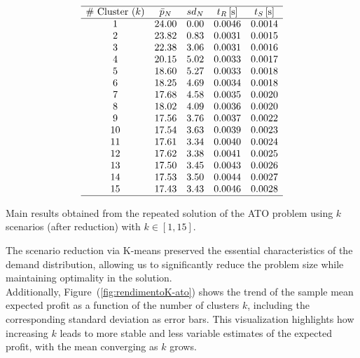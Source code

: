 \documentclass[a4paper,12pt]{article}
\begin{document}
	\begin{table}
		
	\[
	\begin{array}{ccccc}
		\hline
		\text{\# Cluster $(k)$} & \text{$\bar{p}_{N}$} & \text{$sd_{N}$} & \text{$t_{R}$\,[s]} & \text{$t_{S}$\,[s]} \\
		\hline
		1  & 24.00 & 0.00 & 0.0046 & 0.0014 \\
		2  & 23.82 & 0.83 & 0.0031 & 0.0015 \\
		3  & 22.38 & 3.06 & 0.0031 & 0.0016 \\
		4  & 20.15 & 5.02 & 0.0033 & 0.0017 \\
		5  & 18.60 & 5.27 & 0.0033 & 0.0018 \\
		6  & 18.25 & 4.69 & 0.0034 & 0.0018 \\
		7  & 17.68 & 4.58 & 0.0035 & 0.0020 \\
		8  & 18.02 & 4.09 & 0.0036 & 0.0020 \\
		9  & 17.56 & 3.76 & 0.0037 & 0.0022 \\
		10 & 17.54 & 3.63 & 0.0039 & 0.0023 \\
		11 & 17.61 & 3.34 & 0.0040 & 0.0024 \\
		12 & 17.62 & 3.38 & 0.0041 & 0.0025 \\
		13 & 17.50 & 3.45 & 0.0043 & 0.0026 \\
		14 & 17.53 & 3.50 & 0.0044 & 0.0027 \\
		15 & 17.43 & 3.43 & 0.0046 & 0.0028 \\
		\hline
	\end{array}
	\]
	\label{tab:kmeans-ato-results}
	\caption{Main results obtained from the repeated solution of the ATO problem using $k$ scenarios (after reduction) with $k \in [1,15]$.}
	\end{table}
	
	
	The scenario reduction via K-means preserved the essential characteristics of the demand distribution, allowing us to significantly reduce the problem size while maintaining optimality in the solution.	\\
	
	\noindent
	Additionally, Figure~(\ref{fig:rendimentoK-ato}) shows the trend of the sample mean expected profit as a function of the number of clusters $k$, including the corresponding standard deviation as error bars. This visualization highlights how increasing $k$ leads to more stable and less variable estimates of the expected profit, with the mean converging as $k$ grows.
	
\end{document}
